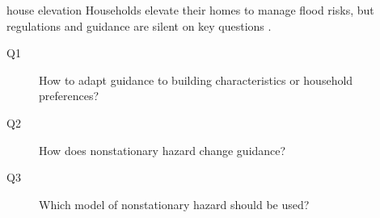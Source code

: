 \begin{block}{house elevation}
    Households elevate their homes to manage flood risks, but regulations and guidance are silent on key questions \cite{zarekarizi_suboptimal:2020,xian_elevation:2017}.
    \begin{framed}
        \begin{description}
            \item[Q1] How to adapt guidance to building characteristics or household preferences?
            \item[Q2] How does nonstationary hazard change guidance?
            \item[Q3] Which model of nonstationary hazard should be used?
        \end{description}
    \end{framed}
    \begin{figure}
        \centering
        \hfill
        \\

\end{figure}
\end{block}
